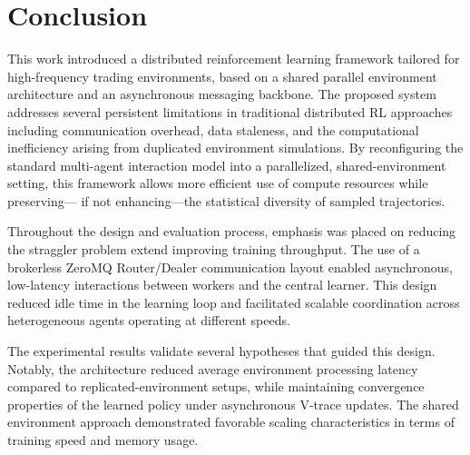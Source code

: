 \chapter{Conclusion}
\label{ch:conclusion}

This work introduced a distributed reinforcement learning framework tailored for high-frequency trading environments,
based on a shared parallel environment architecture and an asynchronous messaging backbone.
The proposed system addresses several persistent limitations in traditional distributed RL approaches
including communication overhead, data staleness, and the computational inefficiency arising from duplicated environment simulations.
By reconfiguring the standard multi-agent interaction model into a parallelized,
shared-environment setting, this framework allows more efficient use of compute resources while preserving---
if not enhancing---the statistical diversity of sampled trajectories.

Throughout the design and evaluation process, emphasis was placed on reducing the straggler problem extend improving training throughput.
The use of a brokerless ZeroMQ Router/Dealer communication layout enabled asynchronous, low-latency interactions between workers and the central learner.
This design reduced idle time in the learning loop and facilitated scalable coordination across heterogeneous agents operating at different speeds.

The experimental results validate several hypotheses that guided this design.
Notably, the architecture reduced average environment processing latency compared to replicated-environment setups,
while maintaining convergence properties of the learned policy under asynchronous V-trace updates.
The shared environment approach demonstrated favorable scaling characteristics in terms of training speed and memory usage.



